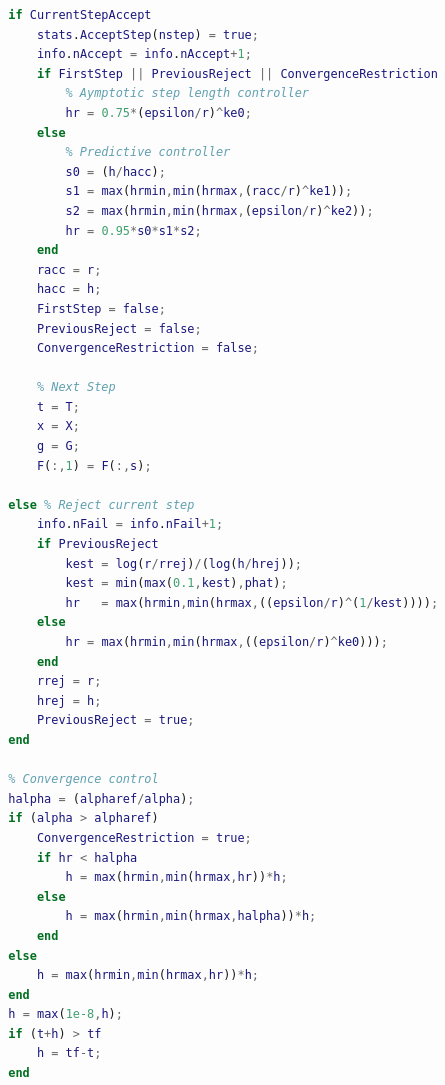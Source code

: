 \begin{lstlisting}[language=Matlab,caption=Implementation of ESDIRK23 with adaptive time step,label=lst7:esdirk]
        % Step Length Controller
        if CurrentStepAccept
            stats.AcceptStep(nstep) = true;
            info.nAccept = info.nAccept+1;
            if FirstStep || PreviousReject || ConvergenceRestriction
                % Aymptotic step length controller
                hr = 0.75*(epsilon/r)^ke0; 
            else
                % Predictive controller
                s0 = (h/hacc);
                s1 = max(hrmin,min(hrmax,(racc/r)^ke1));
                s2 = max(hrmin,min(hrmax,(epsilon/r)^ke2));
                hr = 0.95*s0*s1*s2;
            end
            racc = r;
            hacc = h;
            FirstStep = false;
            PreviousReject = false;
            ConvergenceRestriction = false;
            
            % Next Step
            t = T;
            x = X;
            g = G;
            F(:,1) = F(:,s);            
            
        else % Reject current step
            info.nFail = info.nFail+1;
            if PreviousReject
                kest = log(r/rrej)/(log(h/hrej));
                kest = min(max(0.1,kest),phat);
                hr   = max(hrmin,min(hrmax,((epsilon/r)^(1/kest))));
            else
                hr = max(hrmin,min(hrmax,((epsilon/r)^ke0)));
            end
            rrej = r;
            hrej = h;
            PreviousReject = true;
        end
   
        % Convergence control
        halpha = (alpharef/alpha);
        if (alpha > alpharef)
            ConvergenceRestriction = true;
            if hr < halpha
                h = max(hrmin,min(hrmax,hr))*h;
            else
                h = max(hrmin,min(hrmax,halpha))*h;
            end
        else
            h = max(hrmin,min(hrmax,hr))*h;
        end
        h = max(1e-8,h);
        if (t+h) > tf
            h = tf-t;
        end
        

\end{lstlisting}
